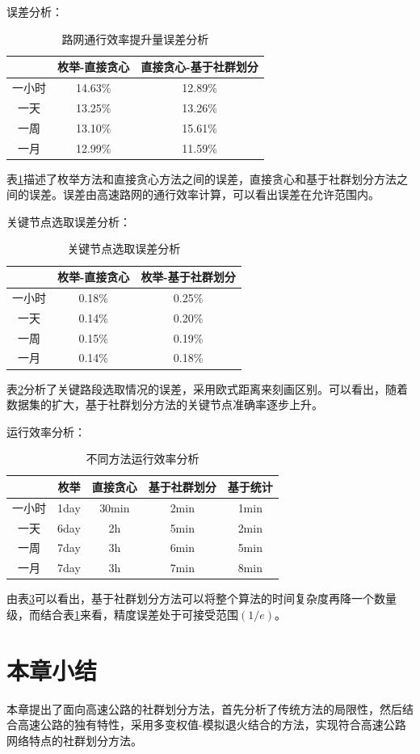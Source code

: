 		误差分析：

				\begin{table}[h]
				\centering
				\begin{tabular}{|c|c|c|}
				\hline
				\hline
				  &  枚举-直接贪心 &  直接贪心-基于社群划分 \\
				\hline
				 一小时 &  14.63\% &  12.89\% \\
				\hline
				 一天 &  13.25\% &  13.26\% \\
				\hline
				 一周 &  13.10\% &  15.61\% \\
				\hline
				 一月 &  12.99\% &  11.59\% \\
				\hline
				\end{tabular}
				\caption{路网通行效率提升量误差分析}
				\label{table1}
				\end{table} 

		表\ref{table1}描述了枚举方法和直接贪心方法之间的误差，直接贪心和基于社群划分方法之间的误差。误差由高速路网的通行效率计算，可以看出误差在允许范围内。

		关键节点选取误差分析：

				\begin{table}[h]
				\centering
				\begin{tabular}{|c|c|c|}
				\hline
				\hline
				   &   枚举-直接贪心 &   枚举-基于社群划分 \\
				\hline
				  一小时 &   0.18\% &   0.25\% \\
				\hline
				  一天 &   0.14\% &   0.20\% \\
				\hline
				  一周 &   0.15\% &   0.19\% \\
				\hline
				  一月 &   0.14\% &   0.18\% \\
				\hline
				\end{tabular}
				\caption{关键节点选取误差分析}
				\label{table2}
				\end{table} 

		表\ref{table2}分析了关键路段选取情况的误差，采用欧式距离来刻画区别。可以看出，随着数据集的扩大，基于社群划分方法的关键节点准确率逐步上升。

		运行效率分析：

				\begin{table}[h]
				\centering
				\begin{tabular}{|c|c|c|c|c|}
				\hline
				\hline
				   &   枚举 &   直接贪心 &   基于社群划分 &   基于统计 \\
				\hline
				  一小时 &   1day &   30min &   2min &   1min \\
				\hline
				  一天 &   6day &   2h &   5min &   2min \\
				\hline
				  一周 &  7day &   3h &   6min &   5min \\
				\hline
				  一月 &   7day &   3h &   7min &   8min \\
				\hline
				\end{tabular}
				\caption{不同方法运行效率分析}
				\label{table3}
				\end{table} 

		由表\ref{table3}可以看出，基于社群划分方法可以将整个算法的时间复杂度再降一个数量级，而结合表\ref{table1}来看，精度误差处于可接受范围$(1/e)$。

	\section{本章小结}
		本章提出了面向高速公路的社群划分方法，首先分析了传统方法的局限性，然后结合高速公路的独有特性，采用多变权值-模拟退火结合的方法，实现符合高速公路网络特点的社群划分方法。